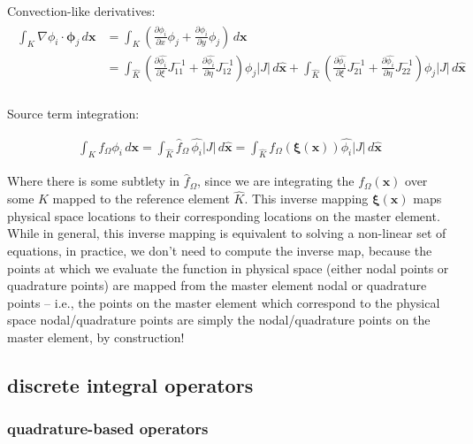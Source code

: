 \documentclass[10pt]{article}
\begin{document}
  Convection-like derivatives:
  \begin{align}
    \begin{split}
      \int_{K}^{} \nabla\phi_i\cdot \bm{\phi}_j \,d\bm{x}
    &= \int_{K}^{} \left( \frac{\partial \phi_i}{\partial x} \phi_j
    + \frac{\partial \phi_i}{\partial y} \phi_j \right)\,d\bm{x} \\
    &= \int_{\widehat{K}} 
    \left( \frac{\partial \widehat{\phi_i}}{\partial \xi} J^{-1}_{11} 
    + \frac{\partial \widehat{\phi_i}}{\partial \eta} J^{-1}_{12} \right) \phi_j
    |J|\,d\bm{\widehat{x}} 
    + \int_{\widehat{K}} 
    \left( \frac{\partial \widehat{\phi_i}}{\partial \xi} J^{-1}_{21} 
    + \frac{\partial \widehat{\phi_i}}{\partial \eta} J^{-1}_{22} \right) \phi_j
    |J|\,d\bm{\widehat{x}} \\
    \end{split}
    \label{eq:cts_weak_convection}
  \end{align}

  Source term integration:

  \begin{align}
    \int_{K}^{} f_\Omega \phi_i\, d\bm{x} 
    = \int_{\widehat{K}}^{} \widehat{f}_\Omega\, \widehat{\phi_i} |J| \, d\bm{\widehat{x}}
    = \int_{\widehat{K}}^{} f_\Omega(\bm{\xi}(\bm{x})) \widehat{\phi_i} |J| \, d\bm{\widehat{x}}
  \end{align}

  Where there is some subtlety in $\widehat{f}_\Omega$, since we are integrating the
  $f_\Omega(\bm{x})$ over some $K$ mapped to the reference element $\widehat{K}$. 
  This inverse mapping $\bm{\xi}(\bm{x})$ maps physical space locations to their corresponding
  locations on the master element. While in general, this inverse mapping is equivalent to solving a
  non-linear set of equations, in practice, we don't need to compute the inverse map, because the
  points at which we evaluate the function in physical space (either nodal points or quadrature
  points) are mapped from the master element nodal or quadrature points -- i.e., the points on the
  master element which correspond to the physical space nodal/quadrature points are simply the
  nodal/quadrature points on the master element, by construction!

\subsection{discrete integral operators} \label{ssec:disc_integral_operators}
  \subsubsection{quadrature-based operators}
\end{document}

